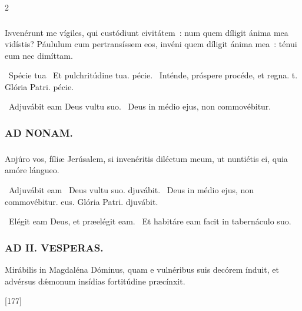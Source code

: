 \documentclass[9pt,twoside]{extarticle}
\begin{document}
\begin{multicols}{2}
{\subsubsection*{}
\lettrine{I}nvenérunt me vígiles, qui custódiunt civitátem~: num quem díligit ánima mea vidístis? Páululum cum pertransíssem eos, invéni quem díligit ánima mea~: ténui eum nec dimíttam.

\begin{tightlist}{}
\item {}~Spécie tua \textred{*}~Et pulchritúdine tua. pécie. ~Inténde, próspere procéde, et regna. t. Glória Patri. pécie.
\item {}~Adjuvábit eam Deus vultu suo. ~Deus in médio ejus, non commovébitur.
\end{tightlist}

\subsubsection*{\center \textsc{AD NONAM.}}
\subsubsection*{}
\lettrine{A}djúro vos, fíliæ Jerúsalem, si invenéritis diléctum meum, ut nuntiétis ei, quia amóre lángueo.

\begin{tightlist}{}
\item {}~Adjuvábit eam \textred{*}~Deus vultu suo. djuvábit. ~Deus in médio ejus, non commovébitur. eus. Glória Patri. djuvábit.
\item {}~Elégit eam Deus, et præelégit eam. ~Et habitáre eam facit in tabernáculo suo.
\end{tightlist}

\subsubsection*{\center \textsc{AD II. VESPERAS.}}
\begin{tightlist}{}
\item {} Mirábilis in Magdaléna Dóminus, quam e vulnéribus suis decórem índuit, et advérsus dǽmonum insídias fortitúdine præcínxit. 
\item {} [177]
\end{tightlist}

}
\end{multicols}
\end{document}
